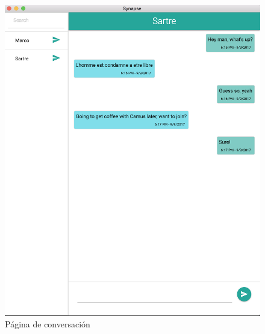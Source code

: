 \begin{figure}[H]
	\centering
	\includegraphics[width=\textwidth]{imagenes/desktop-conversation-page}
	\caption{Página de conversación}
	\label{fig:desktop-conversation}
\end{figure}